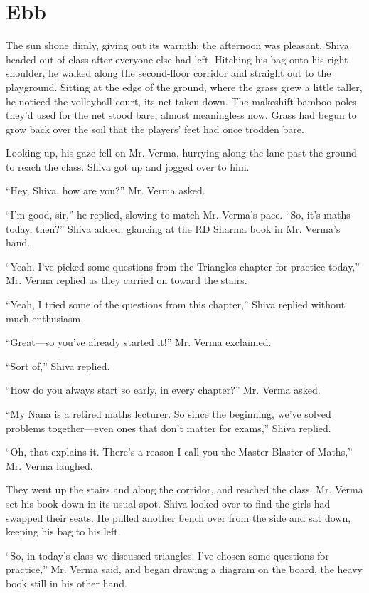 \chapter{Ebb}

The sun shone dimly, giving out its warmth; the afternoon was pleasant. Shiva headed out of class after everyone else had left. Hitching his bag onto his right shoulder, he walked along the second-floor corridor and straight out to the playground. Sitting at the edge of the ground, where the grass grew a little taller, he noticed the volleyball court, its net taken down. The makeshift bamboo poles they'd used for the net stood bare, almost meaningless now. Grass had begun to grow back over the soil that the players' feet had once trodden bare.

Looking up, his gaze fell on Mr. Verma, hurrying along the lane past the ground to reach the class. Shiva got up and jogged over to him.

``Hey, Shiva, how are you?'' Mr. Verma asked.

``I'm good, sir,'' he replied, slowing to match Mr. Verma's pace. ``So, it's maths today, then?'' Shiva added, glancing at the RD Sharma book in Mr. Verma's hand.

``Yeah. I've picked some questions from the Triangles chapter for practice today,'' Mr. Verma replied as they carried on toward the stairs.

``Yeah, I tried some of the questions from this chapter,'' Shiva replied without much enthusiasm.

``Great—so you've already started it!'' Mr. Verma exclaimed.

``Sort of,'' Shiva replied.

``How do you always start so early, in every chapter?'' Mr. Verma asked.

``My Nana is a retired maths lecturer. So since the beginning, we've solved problems together—even ones that don't matter for exams,'' Shiva replied.

``Oh, that explains it. There's a reason I call you the Master Blaster of Maths,'' Mr. Verma laughed.

They went up the stairs and along the corridor, and reached the class. Mr. Verma set his book down in its usual spot. Shiva looked over to find the girls had swapped their seats. He pulled another bench over from the side and sat down, keeping his bag to his left.

``So, in today's class we discussed triangles. I've chosen some questions for practice,'' Mr. Verma said, and began drawing a diagram on the board, the heavy book still in his other hand.

